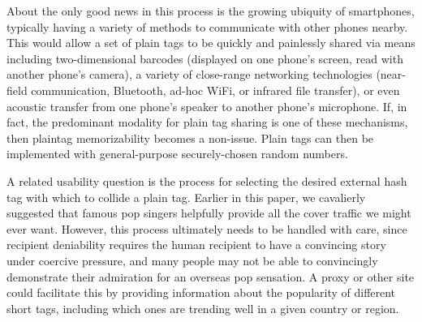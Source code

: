 About the only good news in this process is the growing ubiquity of smartphones, typically having a variety of methods to communicate with other phones nearby. This would allow a set of plain tags to be quickly and painlessly shared via means including two-dimensional barcodes (displayed on one phone's screen, read with another phone's camera), a variety of close-range networking technologies (near-field communication, Bluetooth, ad-hoc WiFi, or infrared file transfer), or even acoustic transfer from one phone's speaker to another phone's microphone. If, in fact, the predominant modality for \hoot plain tag sharing is one of these mechanisms, then plaintag memorizability becomes a non-issue. Plain tags can then be implemented with general-purpose securely-chosen random numbers.

A related usability question is the process for selecting the desired
external hash tag with which to collide a \hoot plain tag. Earlier in
this paper, we cavalierly suggested that famous pop singers helpfully
provide all the cover traffic we might ever want. However, this process
ultimately needs to be handled with care, since recipient deniability
requires the human recipient to have a convincing story under coercive
pressure, and many people may not be able to convincingly demonstrate
their admiration for an overseas pop sensation. A \hoot proxy or other
site could facilitate this by providing information about the popularity
of different short tags, including which ones are trending well in a
given country or region.


